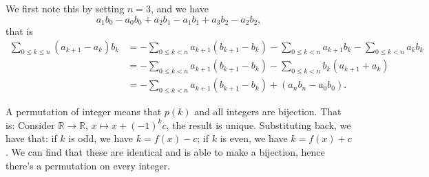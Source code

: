  We first note this by setting $n = 3$, and we have 
\[
    a_1b_0-a_0b_0+a_2b_1-a_1b_1+a_3b_2-a_2b_2,
\]
that is 
\begin{align*}
    \sum_{0\leq k\leq n}^{} (a_{k+1}-a_k)b_k &= 
    -\sum_{0\leq k<n}^{}a_{k+1} (b_{k+1}-b_k)-\sum_{0\leq k<n}^{} a_{k+1}b_k
    -\sum_{0\leq k<n}^{} a_kb_k\\
    &= -\sum_{0\leq k<n}^{}a_{k+1}(b_{k+1}-b_k) - 
      \sum_{0\leq k<n}^{} b_k (a_{k+1} + a_k)\\
    &=  -\sum_{0\leq k<n}^{}a_{k+1}(b_{k+1}-b_k) + (a_n b_n - a_0b_0). 
\end{align*}

 A permutation of integer means that $p(k)$ and all integers 
are bijection. That is: Consider $\mathbb R \to \mathbb R$, $x\mapsto x+(-1)^kc$, the result is 
unique. Substituting back, we have that: if $k$ is odd, we have $k=f(x)-c$; 
if $ k$ is even, we have $k=f(x)+c$. We can find that these are identical
and is able to make a bijection, hence there's a permutation on every
integer. 





